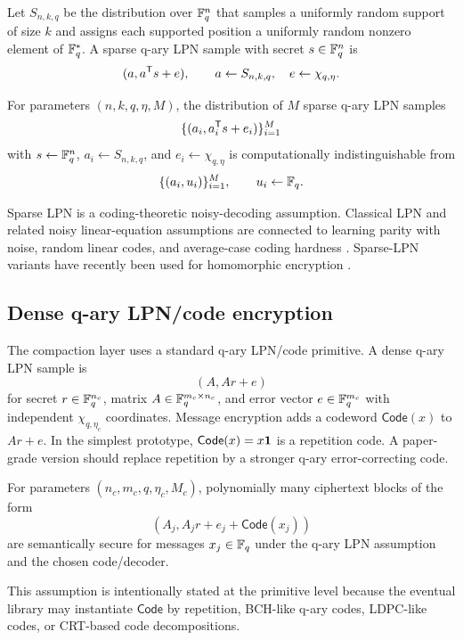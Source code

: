 Let $S_{n,k,q}$ be the distribution over $\mathbb{F}_q^n$ that samples a uniformly random support of size $k$ and assigns each supported position a uniformly random nonzero element of $\mathbb{F}_q^*$.  A sparse q-ary LPN sample with secret $s\in\mathbb{F}_q^n$ is
\[
    (a, a^{\mathsf T} s+e),
    \qquad a\leftarrow S_{n,k,q},\quad e\leftarrow\chi_{q,\eta}.
\]

\begin{assumption}
\label{ass:sparse-lpn}
For parameters $(n,k,q,\eta,M)$, the distribution of $M$ sparse q-ary LPN samples
\[
    \{(a_i,a_i^{\mathsf T} s+e_i)\}_{i=1}^M
\]
with $s\leftarrow\mathbb{F}_q^n$, $a_i\leftarrow S_{n,k,q}$, and $e_i\leftarrow\chi_{q,\eta}$ is computationally indistinguishable from
\[
    \{(a_i,u_i)\}_{i=1}^M,
    \qquad u_i\leftarrow\mathbb{F}_q.
\]
\end{assumption}

Sparse LPN is a coding-theoretic noisy-decoding assumption.  Classical LPN and related noisy linear-equation assumptions are connected to learning parity with noise, random linear codes, and average-case coding hardness \cite{BlumKalaiWasserman2003,Alekhnovich2003,BerlekampMcEliecevanTilborg1978}.  Sparse-LPN variants have recently been used for homomorphic encryption \cite{CorriganGibbsHenzingerKalaiVaikuntanathan2024}.

\subsection{Dense q-ary LPN/code encryption}

The compaction layer uses a standard q-ary LPN/code primitive.  A dense q-ary LPN sample is
\[
    (A,Ar+e)
\]
for secret $r\in\mathbb{F}_q^{n_c}$, matrix $A\in\mathbb{F}_q^{m_c\times n_c}$, and error vector $e\in\mathbb{F}_q^{m_c}$ with independent $\chi_{q,\eta_c}$ coordinates.  Message encryption adds a codeword $\mathsf{Code}(x)$ to $Ar+e$.  In the simplest prototype, $\mathsf{Code}(x)=x\mathbf{1}$ is a repetition code.  A paper-grade version should replace repetition by a stronger q-ary error-correcting code.

\begin{assumption}
\label{ass:clpn}
For parameters $(n_c,m_c,q,\eta_c,M_c)$, polynomially many ciphertext blocks of the form
\[
    (A_j,A_jr+e_j+\mathsf{Code}(x_j))
\]
are semantically secure for messages $x_j\in\mathbb{F}_q$ under the q-ary LPN assumption and the chosen code/decoder.
\end{assumption}

This assumption is intentionally stated at the primitive level because the eventual library may instantiate $\mathsf{Code}$ by repetition, BCH-like q-ary codes, LDPC-like codes, or CRT-based code decompositions.

